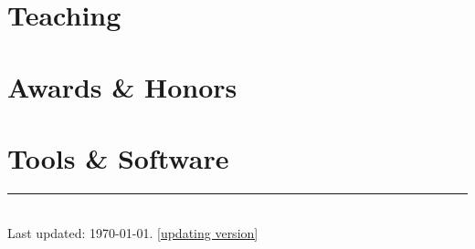 \documentclass[11pt]{article} %
\begin{document}
\section*{Teaching}
\label{teaching}



\section*{Awards \& Honors}
\label{awards}



\section*{Tools \& Software}
\label{tools}











% 


% 


%


\centering
\rule{0.25\linewidth}{0.4pt}\\
\medskip
Last updated: \today. \href{https://ynbsztl.github.io/CV_Tianlei.pdf}{[updating version]}
\end{document}
